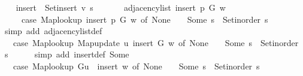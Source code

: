 \begin{isabellebody}
\ \ \isamarkupfalse%
\ {\isacharquery}{\kern0pt}insert\ {\isacharequal}{\kern0pt}\ {\isachardoublequoteopen}Set{\isacharunderscore}{\kern0pt}insert\ {\isacharquery}{\kern0pt}v\ s{\isachardoublequoteclose}\isanewline
\ \ \isamarkupfalse%
\isanewline
\ \ \ \ {\isachardoublequoteopen}adjacency{\isacharunderscore}{\kern0pt}list\ {\isacharparenleft}{\kern0pt}insert\ p\ G{\isacharparenright}{\kern0pt}\ w\ {\isacharequal}{\kern0pt}\isanewline
\ \ \ \ \ {\isacharparenleft}{\kern0pt}case\ Map{\isacharunderscore}{\kern0pt}lookup\ {\isacharparenleft}{\kern0pt}insert\ p\ G{\isacharparenright}{\kern0pt}\ w\ of\ None\ {\isasymRightarrow}\ {\isacharbrackleft}{\kern0pt}{\isacharbrackright}{\kern0pt}\ {\isacharbar}{\kern0pt}\ Some\ s\ {\isasymRightarrow}\ Set{\isacharunderscore}{\kern0pt}inorder\ s{\isacharparenright}{\kern0pt}{\isachardoublequoteclose}\isanewline
\ \ \ \ \isamarkupfalse%
\ {\isacharparenleft}{\kern0pt}simp\ add{\isacharcolon}{\kern0pt}\ adjacency{\isacharunderscore}{\kern0pt}list{\isacharunderscore}{\kern0pt}def{\isacharparenright}{\kern0pt}\isanewline
\ \ \isamarkupfalse%
\ \isamarkupfalse%
\ {\isachardoublequoteopen}{\isachardot}{\kern0pt}{\isachardot}{\kern0pt}{\isachardot}{\kern0pt}\ {\isacharequal}{\kern0pt}\ {\isacharparenleft}{\kern0pt}case\ Map{\isacharunderscore}{\kern0pt}lookup\ {\isacharparenleft}{\kern0pt}Map{\isacharunderscore}{\kern0pt}update\ {\isacharquery}{\kern0pt}u\ {\isacharquery}{\kern0pt}insert\ G{\isacharparenright}{\kern0pt}\ w\ of\ None\ {\isasymRightarrow}\ {\isacharbrackleft}{\kern0pt}{\isacharbrackright}{\kern0pt}\ {\isacharbar}{\kern0pt}\ Some\ s\ {\isasymRightarrow}\ Set{\isacharunderscore}{\kern0pt}inorder\ s{\isacharparenright}{\kern0pt}{\isachardoublequoteclose}\isanewline
\ \ \ \ \isamarkupfalse%
\ {\isacharparenleft}{\kern0pt}simp\ add{\isacharcolon}{\kern0pt}\ insert{\isacharunderscore}{\kern0pt}def\ Some{\isacharparenright}{\kern0pt}\isanewline
\ \ \isamarkupfalse%
\ \isamarkupfalse%
\ {\isachardoublequoteopen}{\isachardot}{\kern0pt}{\isachardot}{\kern0pt}{\isachardot}{\kern0pt}\ {\isacharequal}{\kern0pt}\ {\isacharparenleft}{\kern0pt}case\ {\isacharparenleft}{\kern0pt}Map{\isacharunderscore}{\kern0pt}lookup\ G{\isacharparenleft}{\kern0pt}{\isacharquery}{\kern0pt}u\ {\isasymmapsto}\ {\isacharquery}{\kern0pt}insert{\isacharparenright}{\kern0pt}{\isacharparenright}{\kern0pt}\ w\ of\ None\ {\isasymRightarrow}\ {\isacharbrackleft}{\kern0pt}{\isacharbrackright}{\kern0pt}\ {\isacharbar}{\kern0pt}\ Some\ s\ {\isasymRightarrow}\ Set{\isacharunderscore}{\kern0pt}inorder\ s{\isacharparenright}{\kern0pt}{\isachardoublequoteclose}\isanewline

\end{isabellebody}
